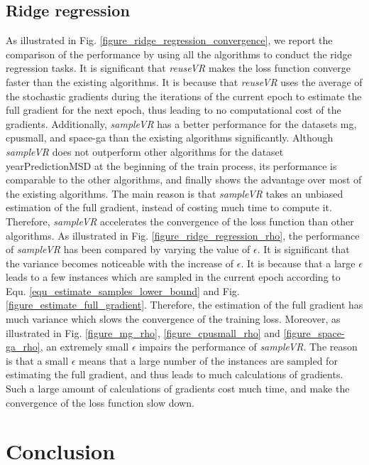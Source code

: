 \documentclass[letterpaper]{article}
\begin{document}
\subsection{Ridge regression}
\label{sect_performance_evaluation_convergence}
As illustrated in Fig. \ref{figure_ridge_regression_convergence}, we report the comparison of the performance by using all the algorithms to  conduct the ridge regression tasks. It is significant that  \emph{reuseVR} makes the loss function converge faster than the existing algorithms. It is because that \emph{reuseVR} uses the average of the stochastic gradients during the iterations of the current epoch to estimate the full gradient for the next epoch, thus leading to  no computational cost of the gradients. Additionally, \emph{sampleVR} has a better performance for the datasets mg, cpusmall, and space-ga than the existing algorithms significantly.  Although \emph{sampleVR} does not outperform other algorithms for the dataset yearPredictionMSD at the beginning of the train process, its performance is comparable to the other algorithms, and finally shows the advantage over most of the existing algorithms. The main reason is that \emph{sampleVR} takes an unbiased estimation of the full gradient, instead of costing much time to compute it. Therefore, \emph{sampleVR} accelerates the convergence of the loss function than other algorithms. As illustrated in Fig. \ref{figure_ridge_regression_rho}, the performance of \emph{sampleVR} has been compared by varying the value of $\epsilon$. It is significant that the variance becomes noticeable with the increase of $\epsilon$. It is because that a large $\epsilon$ leads to a few instances which are sampled in the current epoch according to Equ. \ref{equ_estimate_samples_lower_bound} and Fig. \ref{figure_estimate_full_gradient}. Therefore, the estimation of the full gradient has much variance which slows the convergence of the training loss. Moreover, as illustrated in Fig. \ref{figure_mg_rho}, \ref{figure_cpusmall_rho} and \ref{figure_space-ga_rho}, an extremely small  $\epsilon$  impairs  the performance of \emph{sampleVR}. The reason is that a small $\epsilon$ means that a large number of the instances are sampled for estimating the full gradient, and thus leads to much calculations of gradients. Such a large amount of calculations of gradients cost much time, and make the convergence of the loss function slow down.  



\section{Conclusion}
\label{sect_conclusion}





\end{document}
